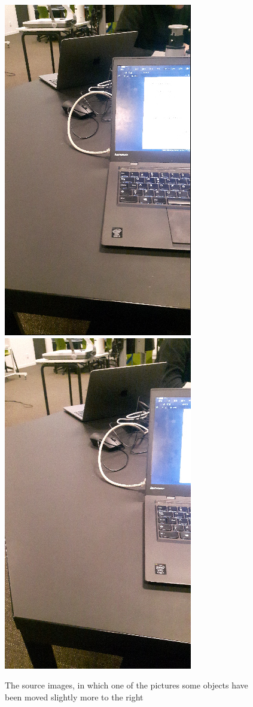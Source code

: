 \documentclass[a4paper, titlepage,12pt]{article}
\begin{document}
\begin{figure}[H]
	\begin{center}
		\includegraphics[scale=0.6]{./flow_src_0.jpg}
		\includegraphics[scale=0.6]{./flow_src_1.jpg}
		\caption{The source images, in which one of the pictures some objects have been moved slightly more to the right}
	\end{center}
\end{figure}
\end{document}
